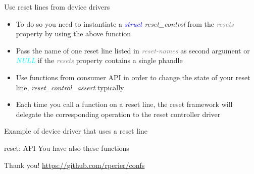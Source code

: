\documentclass{beamer}
\begin{document}
\begin{frame}{Use reset lines from device drivers}
	
	\begin{itemize}
		\item To do so you need to instantiate a \textit{\textcolor{blue}{struct} reset\_control} from the \textit{\textcolor{gray}{resets}} property by using the above function
		\item Pass the name of one reset line listed in \textit{\textcolor{gray}{reset-names}} as second argument or \textit{\textcolor{cyan}{NULL}} if the \textit{\textcolor{gray}{resets}} property contains a single phandle 
		\item Use functions from consumer API in order to change the state of your reset line, \textit{reset\_control\_assert} typically
		\item Each time you call a function on a reset line, the reset framework will delegate the corresponding operation to the reset controller driver
	\end{itemize}
\end{frame}

\begin{frame}{Example of device driver that uses a reset line}
	
\end{frame}

\begin{frame}{reset: API}
	You have also these functions
	
\end{frame}

\begin{frame}{Thank you!}
	\vfill
	\vfill
	\url{https://github.com/rperier/confs}
\end{frame}
\end{document}
